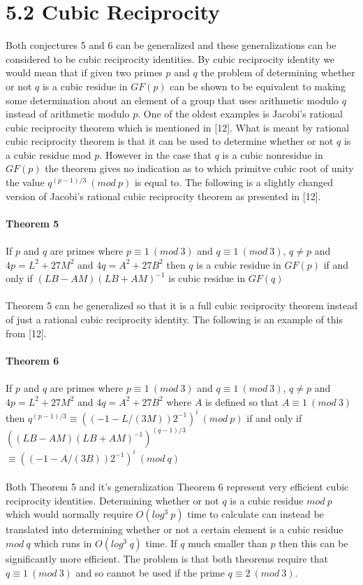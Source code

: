 \documentclass[final,letterpaper,oneside,10pt]{article}
\begin{document}
\section*{5.2 Cubic Reciprocity}

Both conjectures 5 and 6 can be generalized and these generalizations can be considered to be cubic reciprocity identities.  By cubic reciprocity identity we would mean that if given two primes $p$ and $q$ the problem of determining whether or not $q$ is a cubic residue in $GF(p)$ can be shown to be equivalent to making some determination about an element of a group that uses arithmetic modulo $q$ instead of arithmetic modulo $p$.  One of the oldest examples is Jacobi's rational cubic reciprocity theorem which is mentioned in [12].  What is meant by rational cubic reciprocity theorem is that it can be used to determine whether or not $q$ is a cubic residue mod $p$.  However in the case that $q$ is a cubic nonresidue in $GF(p)$ the theorem gives no indication as to which primitve cubic root of unity the value $q^{(p-1)/3}~(mod~p)$ is equal to.  The following is a slightly changed version of Jacobi's rational cubic reciprocity theorem as presented in [12].
\\
\\
\textbf{Theorem 5}
\\
\\
If $p$ and $q$ are primes where $p \equiv 1~ (mod~ 3)$ and $q \equiv 1~ (mod~ 3)$, $q \ne p$ and $4p = L^{2}+27M^{2}$  and $4q = A^{2}+27B^{2}$ then $q$ is a cubic residue in $GF(p)$ if and only if $(LB-AM)(LB+AM)^{-1}$  is cubic residue in $GF(q)$
\\
\\
Theorem 5 can be generalized so that it is a full cubic reciprocity theorem instead of just a rational cubic reciprocity identity.  The following is an example of this from [12].
\\
\\
\textbf{Theorem 6}
\\
\\
If $p$ and $q$ are primes where $p \equiv 1~ (mod~ 3)$ and $q \equiv 1~ (mod~ 3)$, $q \ne p$ and $4p = L^{2}+27M^{2}$  and $4q = A^{2}+27B^{2}$ where $A$ is defined so that $A \equiv 1~(mod~3)$ then $q^{(p-1)/3} \equiv ((-1-L/(3M))2^{-1})^{i}~(mod~p)$ if and only if
\\
$((LB-AM)(LB+AM)^{-1})^{(q-1)/3}$   $\equiv ((-1-A/(3B))2^{-1})^{i}~(mod~q)$ 
\\
\\
Both Theorem 5 and it's generalization Theorem 6 represent very efficient cubic reciprocity identities.  Determining whether or not $q$ is a cubic residue $mod~ p$ which would normally require $O(log^{3}~p)$ time to calculate can instead be translated into determining whether or not a certain element is a cubic residue $mod~ q$ which runs in $O(log^{3}~q)$ time.  If $q$ much smaller than $p$ then this can be significantly more efficient.  The problem is that both theorems require that $q \equiv 1~(mod~3)$ and so cannot be used if the prime $q \equiv 2~(mod~3)$.
\end{document}
